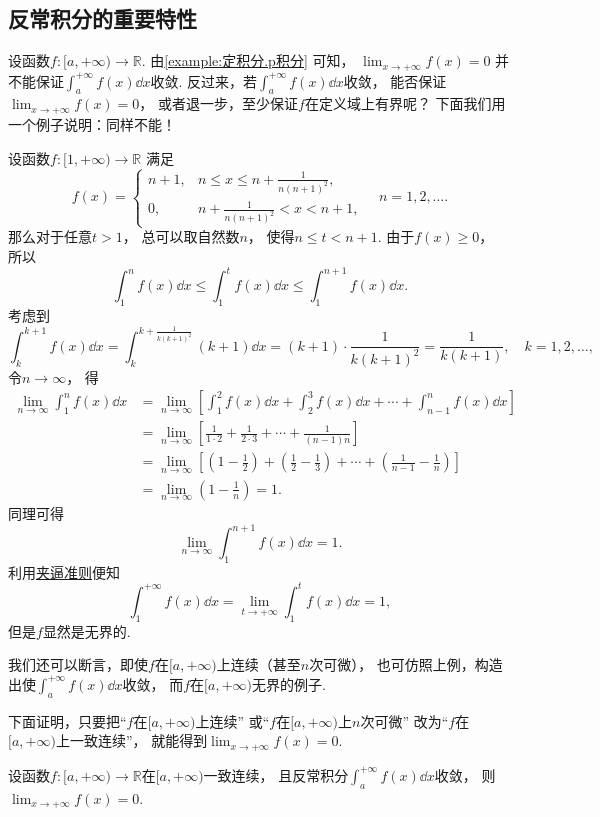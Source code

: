 \subsection{反常积分的重要特性}
设函数\(f\colon[a,+\infty)\to\mathbb{R}\).
由\cref{example:定积分.p积分} 可知，
\(\lim_{x\to+\infty} f(x) = 0\)
并不能保证\(\int_a^{+\infty} f(x) \dd{x}\)收敛.
反过来，若\(\int_a^{+\infty} f(x) \dd{x}\)收敛，
能否保证\(\lim_{x\to+\infty} f(x) = 0\)，
或者退一步，至少保证\(f\)在定义域上有界呢？
下面我们用一个例子说明：同样不能！
\begin{example}
设函数\(f\colon[1,+\infty)\to\mathbb{R}\)
满足\[
	f(x) = \left\{ \begin{array}{cl}
		n+1, & n \leq x \leq n+\frac1{n(n+1)^2}, \\
		0, & n+\frac1{n(n+1)^2} < x < n+1,
	\end{array} \right.
	\quad n=1,2,\dotsc.
\]
那么对于任意\(t>1\)，
总可以取自然数\(n\)，
使得\(n \leq t < n+1\).
由于\(f(x)\geq0\)，
所以\[
	\int_1^n f(x) \dd{x}
	\leq \int_1^t f(x) \dd{x}
	\leq \int_1^{n+1} f(x) \dd{x}.
\]
考虑到\[
	\int_k^{k+1} f(x) \dd{x}
	= \int_k^{k+\frac1{k(k+1)^2}} (k+1) \dd{x}
	= (k+1) \cdot \frac1{k(k+1)^2}
	= \frac1{k(k+1)},
	\quad k=1,2,\dotsc,
\]
令\(n\to\infty\)，
得\begin{align*}
	\lim_{n\to\infty} \int_1^n f(x) \dd{x}
	&= \lim_{n\to\infty} \left[
		\int_1^2 f(x) \dd{x}
		+ \int_2^3 f(x) \dd{x}
		+ \dotsb
		+ \int_{n-1}^n f(x) \dd{x}
	\right] \\
	&= \lim_{n\to\infty} \left[
		\frac1{1\cdot2}
		+ \frac1{2\cdot3}
		+ \dotsb
		+ \frac1{(n-1)n}
	\right] \\
	&= \lim_{n\to\infty} \left[
		\left(1-\frac12\right)
		+ \left(\frac12-\frac13\right)
		+ \dotsb
		+ \left(\frac1{n-1}-\frac1n\right)
	\right] \\
	&= \lim_{n\to\infty} \left(1-\frac1n\right)
	= 1.
\end{align*}
同理可得\[
	\lim_{n\to\infty} \int_1^{n+1} f(x) \dd{x} = 1.
\]
利用\hyperref[theorem:数列极限.夹逼准则]{夹逼准则}便知\[
	\int_1^{+\infty} f(x) \dd{x}
	= \lim_{t\to+\infty} \int_1^t f(x) \dd{x}
	= 1,
\]
但是\(f\)显然是无界的.
\end{example}
我们还可以断言，即使\(f\)在\([a,+\infty)\)上连续（甚至\(n\)次可微），
也可仿照上例，构造出使\(\int_a^{+\infty} f(x) \dd{x}\)收敛，
而\(f\)在\([a,+\infty)\)无界的例子.

下面证明，只要把“\(f\)在\([a,+\infty)\)上连续”
或“\(f\)在\([a,+\infty)\)上\(n\)次可微”
改为“\(f\)在\([a,+\infty)\)上一致连续”，
就能得到\(\lim_{x\to+\infty} f(x) = 0\).

\begin{proposition}
设函数\(f\colon[a,+\infty)\to\mathbb{R}\)在\([a,+\infty)\)一致连续，
且反常积分\(\int_a^{+\infty} f(x) \dd{x}\)收敛，
则\(\lim_{x\to+\infty} f(x) = 0\).
\end{proposition}
